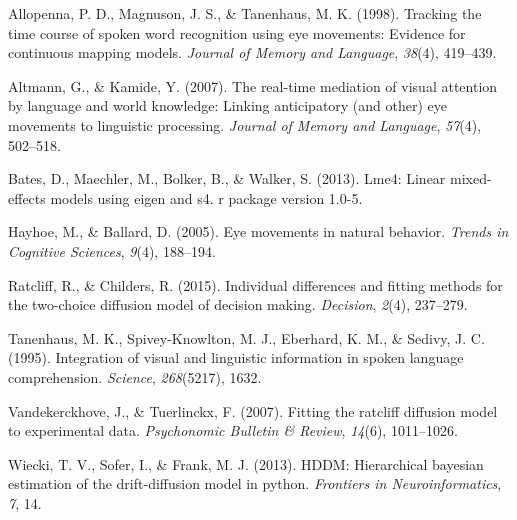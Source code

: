 \documentclass[10pt, letterpaper]{article}
\begin{document}
\setlength{\parindent}{-0.1in} \setlength{\leftskip}{0.125in} \noindent

\hypertarget{refs}{}
\hypertarget{ref-allopenna1998tracking}{}
Allopenna, P. D., Magnuson, J. S., \& Tanenhaus, M. K. (1998). Tracking
the time course of spoken word recognition using eye movements: Evidence
for continuous mapping models. \emph{Journal of Memory and Language},
\emph{38}(4), 419--439.

\hypertarget{ref-altmann2007real}{}
Altmann, G., \& Kamide, Y. (2007). The real-time mediation of visual
attention by language and world knowledge: Linking anticipatory (and
other) eye movements to linguistic processing. \emph{Journal of Memory
and Language}, \emph{57}(4), 502--518.

\hypertarget{ref-bates2013lme4}{}
Bates, D., Maechler, M., Bolker, B., \& Walker, S. (2013). Lme4: Linear
mixed-effects models using eigen and s4. r package version 1.0-5.

\hypertarget{ref-hayhoe2005eye}{}
Hayhoe, M., \& Ballard, D. (2005). Eye movements in natural behavior.
\emph{Trends in Cognitive Sciences}, \emph{9}(4), 188--194.

\hypertarget{ref-ratcliff2015individual}{}
Ratcliff, R., \& Childers, R. (2015). Individual differences and fitting
methods for the two-choice diffusion model of decision making.
\emph{Decision}, \emph{2}(4), 237--279.

\hypertarget{ref-tanenhaus1995integration}{}
Tanenhaus, M. K., Spivey-Knowlton, M. J., Eberhard, K. M., \& Sedivy, J.
C. (1995). Integration of visual and linguistic information in spoken
language comprehension. \emph{Science}, \emph{268}(5217), 1632.

\hypertarget{ref-vandekerckhove2007fitting}{}
Vandekerckhove, J., \& Tuerlinckx, F. (2007). Fitting the ratcliff
diffusion model to experimental data. \emph{Psychonomic Bulletin \&
Review}, \emph{14}(6), 1011--1026.

\hypertarget{ref-wiecki2013hddm}{}
Wiecki, T. V., Sofer, I., \& Frank, M. J. (2013). HDDM: Hierarchical
bayesian estimation of the drift-diffusion model in python.
\emph{Frontiers in Neuroinformatics}, \emph{7}, 14.
\end{document}

